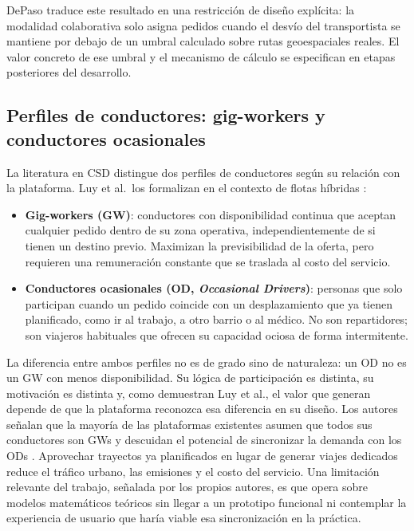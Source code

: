 DePaso traduce este resultado en una restricción de diseño explícita: la modalidad colaborativa solo asigna pedidos cuando el desvío del transportista se mantiene por debajo de un umbral calculado sobre rutas geoespaciales reales. El valor concreto de ese umbral y el mecanismo de cálculo se especifican en etapas posteriores del desarrollo.

\subsection{Perfiles de conductores: gig-workers y conductores ocasionales}

La literatura en CSD distingue dos perfiles de conductores según su relación con la plataforma. Luy et al.\ los formalizan en el contexto de flotas híbridas \parencite{LuyEtAl2023}:

\begin{itemize}[leftmargin=2em]
    \item \textbf{Gig-workers (GW)}: conductores con disponibilidad continua que aceptan cualquier pedido dentro de su zona operativa, independientemente de si tienen un destino previo. Maximizan la previsibilidad de la oferta, pero requieren una remuneración constante que se traslada al costo del servicio.
    \item \textbf{Conductores ocasionales (OD, \emph{Occasional Drivers})}: personas que solo participan cuando un pedido coincide con un desplazamiento que ya tienen planificado, como ir al trabajo, a otro barrio o al médico. No son repartidores; son viajeros habituales que ofrecen su capacidad ociosa de forma intermitente.
\end{itemize}

La diferencia entre ambos perfiles no es de grado sino de naturaleza: un OD no es un GW con menos disponibilidad. Su lógica de participación es distinta, su motivación es distinta y, como demuestran Luy et al., el valor que generan depende de que la plataforma reconozca esa diferencia en su diseño. Los autores señalan que la mayoría de las plataformas existentes asumen que todos sus conductores son GWs y descuidan el potencial de sincronizar la demanda con los ODs \parencite{LuyEtAl2023}. Aprovechar trayectos ya planificados en lugar de generar viajes dedicados reduce el tráfico urbano, las emisiones y el costo del servicio. Una limitación relevante del trabajo, señalada por los propios autores, es que opera sobre modelos matemáticos teóricos sin llegar a un prototipo funcional ni contemplar la experiencia de usuario que haría viable esa sincronización en la práctica.

